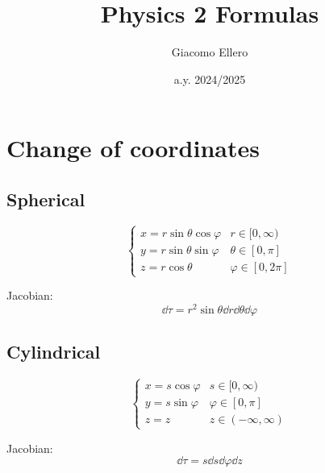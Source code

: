 \documentclass[10pt]{extarticle}
\title{Physics 2 Formulas}
\author{Giacomo Ellero}
\date{a.y. 2024/2025}
\numberwithin{equation}{section}
\begin{document}
\section{Change of coordinates}
\begin{multicols}{2}

	\subsection{Spherical}
	\begin{equation}
		\begin{cases}
			x = r \sin \theta \cos \varphi & r \in [0, \infty)     \\
			y = r \sin \theta \sin \varphi & \theta \in [0, \pi]   \\
			z = r \cos \theta              & \varphi \in [0, 2\pi]
		\end{cases}
	\end{equation}

	Jacobian:
	\begin{equation}
		\dd{\tau} = r^2 \sin \theta \dd{r} \dd{\theta} \dd{\varphi}
	\end{equation}

	\subsection{Cylindrical}
	\begin{equation}
		\begin{cases}
			x = s \cos \varphi & s \in [0, \infty)       \\
			y = s \sin \varphi & \varphi \in [0, \pi]    \\
			z = z              & z \in (-\infty, \infty)
		\end{cases}
	\end{equation}

	Jacobian:
	\begin{equation}
		\dd{\tau} = s \dd{s} \dd{\varphi} \dd{z}
	\end{equation}
\end{multicols}
\end{document}
